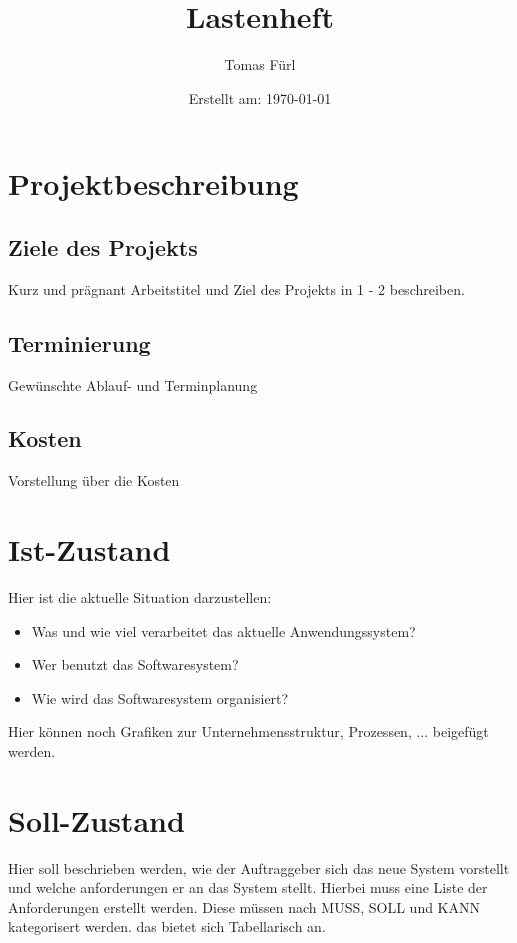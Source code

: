 \documentclass[a4paper, 12pt]{article}
\title{Lastenheft \Projektname}
\date{Erstellt am: \today}
\author{Tomas Fürl}
\begin{document}
    \maketitle
    \newpage

    \section{Projektbeschreibung}
    \subsection{Ziele des Projekts}
    Kurz und prägnant Arbeitstitel und Ziel des Projekts in 1 - 2 beschreiben.
    \subsection{Terminierung}
    Gewünschte Ablauf- und Terminplanung
    \subsection{Kosten}
    Vorstellung über die Kosten

    \section{Ist-Zustand}
    Hier ist die aktuelle Situation darzustellen:
    \begin{itemize}
        \item Was und wie viel verarbeitet das aktuelle Anwendungssystem?
        \item Wer benutzt das Softwaresystem?
        \item Wie wird das Softwaresystem organisiert?
    \end{itemize}
    Hier können noch Grafiken zur Unternehmensstruktur, Prozessen, ... beigefügt werden.

    \section{Soll-Zustand}
    Hier soll beschrieben werden, wie der Auftraggeber sich das neue System vorstellt und 
    welche anforderungen er an das System stellt.
    Hierbei muss eine Liste der Anforderungen erstellt werden.
    Diese müssen nach MUSS, SOLL und KANN kategorisert werden.
    das bietet sich Tabellarisch an.
\end{document}
